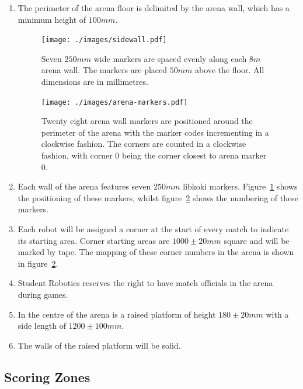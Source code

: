 \begin{enumerate}
\item The perimeter of the arena floor is delimited by the arena wall, which has a minimum height of $100mm$.

\begin{figure}
  \centering
  \texttt{[image: ./images/sidewall.pdf]}
  \caption{Seven $250mm$ wide markers are spaced evenly along each $8m$ arena wall.
           The markers are placed $50mm$ above the floor.
           All dimensions are in millimetres.}
  \label{fig:arena-wall}
\end{figure}

\begin{figure}
  \centering
  \texttt{[image: ./images/arena-markers.pdf]}
  \caption{Twenty eight arena wall markers are positioned around the perimeter of the arena with the marker codes incrementing in a clockwise fashion.
           The corners are counted in a clockwise fashion, with corner 0 being the corner closest to arena marker 0.}
  \label{fig:arena-zones}
\end{figure}

\item Each wall of the arena features seven $250mm$ libkoki markers.
      Figure~\ref{fig:arena-wall} shows the positioning of these markers, whilst figure~\ref{fig:arena-zones} shows the numbering of these markers.

\item Each robot will be assigned a corner at the start of every match to indicate its starting area.
      Corner starting areas are $1000 \pm 20mm$ square and will be marked by tape.
      The mapping of these corner numbers in the arena is shown in figure~\ref{fig:arena-zones}.

\item Student Robotics reserves the right to have match officials in the arena during games.

\item In the centre of the arena is a raised platform of height $180 \pm 20mm$ with a side length of $1200 \pm 100 mm$.

\item The walls of the raised platform will be solid.

\end{enumerate}


\subsection{Scoring Zones}
\label{sub:Zones}

